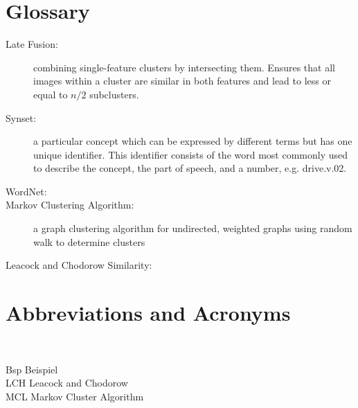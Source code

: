 \section{Glossary} %

\begin{description}
\item[Late Fusion:] combining single-feature clusters by intersecting them. Ensures that all images within a cluster are similar in both features and lead to less or equal to $n/2$ subclusters.

\item[Synset:] a particular concept which can be expressed by different terms but has one unique identifier. This identifier consists of the word most commonly used to describe the concept, the part of speech, and a number, e.g. drive.v.02.

\item[WordNet:]

\item[Markov Clustering Algorithm:] a graph clustering algorithm for undirected, weighted graphs using random walk to determine clusters

\item[Leacock and Chodorow Similarity:]
\end{description}


\newpage

\section{Abbreviations and Acronyms}

\begin{tabbing}
\hspace*{3cm}\=  \\ \kill

Bsp \> Beispiel\\
LCH \> Leacock and Chodorow\\
MCL \> Markov Cluster Algorithm\\

\end{tabbing}
